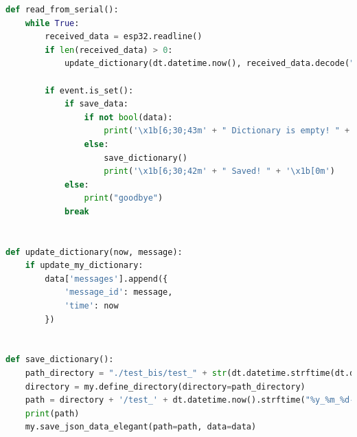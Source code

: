 \begin{lstlisting}[language=Python, caption= lettura da porta seriale e creazione del file di log]
def read_from_serial():
    while True:
        received_data = esp32.readline()
        if len(received_data) > 0:
            update_dictionary(dt.datetime.now(), received_data.decode("utf-8"))

        if event.is_set():
            if save_data:
                if not bool(data):
                    print('\x1b[6;30;43m' + " Dictionary is empty! " + '\x1b[0m')
                else:
                    save_dictionary()
                    print('\x1b[6;30;42m' + " Saved! " + '\x1b[0m')
            else:
                print("goodbye")
            break
            
            
def update_dictionary(now, message):
    if update_my_dictionary:
        data['messages'].append({
            'message_id': message,
            'time': now
        })


def save_dictionary():
    path_directory = "./test_bis/test_" + str(dt.datetime.strftime(dt.datetime.now(), "%Y_%m_%d"))
    directory = my.define_directory(directory=path_directory)
    path = directory + '/test_' + dt.datetime.now().strftime("%y_%m_%d-%H_%M_%S") + '.json'
    print(path)
    my.save_json_data_elegant(path=path, data=data)
\end{lstlisting}

